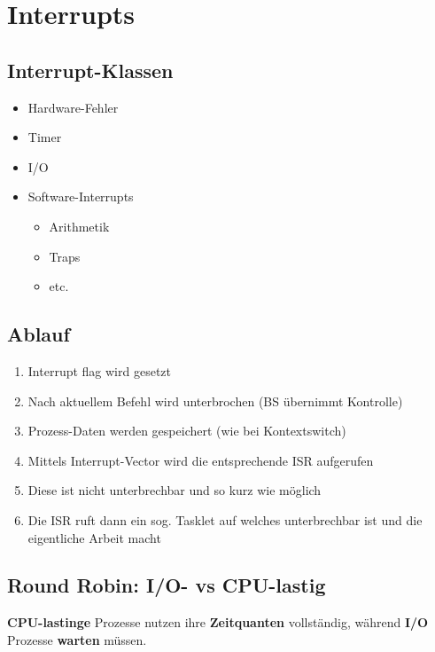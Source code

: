 \section{Interrupts}
\subsection{Interrupt-Klassen}
\begin{itemize}
    \item Hardware-Fehler
    \item Timer
    \item I/O
    \item Software-Interrupts
    \begin{itemize}
        \item Arithmetik
        \item Traps
        \item etc.
    \end{itemize}
\end{itemize}

\subsection{Ablauf}
\begin{enumerate}
    \item Interrupt flag wird gesetzt
	\item Nach aktuellem Befehl wird unterbrochen (BS übernimmt Kontrolle)
	\item Prozess-Daten werden gespeichert (wie bei Kontextswitch)
	\item Mittels Interrupt-Vector wird die entsprechende ISR aufgerufen
	\item Diese ist nicht unterbrechbar und so kurz wie möglich
	\item Die ISR ruft dann ein sog. Tasklet auf welches unterbrechbar ist und die eigentliche Arbeit macht
\end{enumerate}

\subsection{Round Robin: I/O- vs CPU-lastig}
\textbf{CPU-lastinge} Prozesse nutzen ihre \textbf{Zeitquanten} vollständig, während \textbf{I/O}
Prozesse \textbf{warten} müssen.


